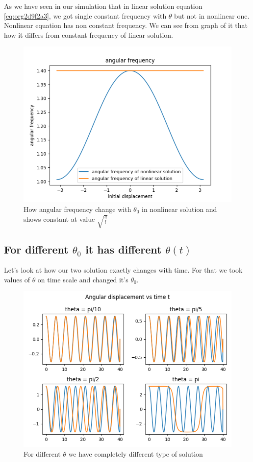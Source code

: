 \documentclass[11pt,a4paper]{article}
\begin{document}
As we have seen in our simulation that in linear solution equation \ref{eq:org2d9f2a3}, we got single constant frequency with \(\theta\) but not in nonlinear one. Nonlinear equation has non constant frequency. We can see from graph of it that how it differs from constant frequency of linear solution. \cite{sobamowo2020exact}\cite{johannessen2014analytical}

\begin{figure}[htbp]
\centering
\includegraphics[width=0.8 \textwidth]{angfre.png}
\caption{\label{fig:orgc4d2da3}How angular frequency change with \(\theta_{0}\) in nonlinear solution and shows constant at value \(\sqrt{\frac{g}{l}}\)}
\end{figure}


\subsection{For different \(\theta_{0}\) it has different \(\theta(t)\)}
\label{sec:org1698581}

Let's look at how our two solution exactly changes with time. For that we took values of \(\theta\) on time scale and changed it's \(\theta_{0}\).

\begin{figure}[htbp]
\centering
\includegraphics[width=0.8 \textwidth]{thetawitht.png}
\caption{\label{fig:orgbc94815}For different \(\theta\) we have completely different type of solution}
\end{figure}
\end{document}
